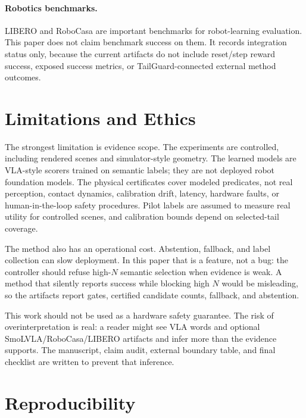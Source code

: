 \documentclass{article}
\begin{document}
\paragraph{Robotics benchmarks.}
LIBERO \citep{liu2023libero} and RoboCasa \citep{nasiriany2024robocasa} are important benchmarks for robot-learning evaluation. This paper does not claim benchmark success on them. It records integration status only, because the current artifacts do not include reset/step reward success, exposed success metrics, or TailGuard-connected external method outcomes.

\section{Limitations and Ethics}

The strongest limitation is evidence scope. The experiments are controlled, including rendered scenes and simulator-style geometry. The learned models are VLA-style scorers trained on semantic labels; they are not deployed robot foundation models. The physical certificates cover modeled predicates, not real perception, contact dynamics, calibration drift, latency, hardware faults, or human-in-the-loop safety procedures. Pilot labels are assumed to measure real utility for controlled scenes, and calibration bounds depend on selected-tail coverage.

The method also has an operational cost. Abstention, fallback, and label collection can slow deployment. In this paper that is a feature, not a bug: the controller should refuse high-$N$ semantic selection when evidence is weak. A method that silently reports success while blocking high $N$ would be misleading, so the artifacts report gates, certified candidate counts, fallback, and abstention.

This work should not be used as a hardware safety guarantee. The risk of overinterpretation is real: a reader might see VLA words and optional SmoLVLA/RoboCasa/LIBERO artifacts and infer more than the evidence supports. The manuscript, claim audit, external boundary table, and final checklist are written to prevent that inference.

\section{Reproducibility}
\end{document}

